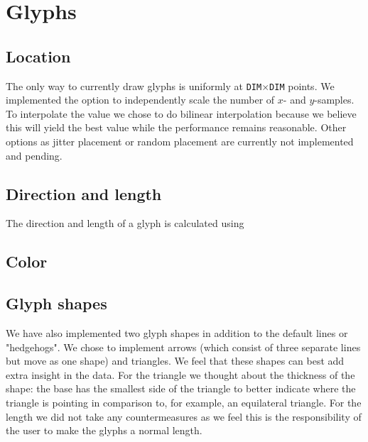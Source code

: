 \section{Glyphs}
	\label{sec:glyphs}
	\subsection*{Location}
		The only way to currently draw glyphs is uniformly at \texttt{DIM}$\times$\texttt{DIM} points.
		We implemented the option to independently scale the number of $x$- and $y$-samples.
		To interpolate the value we chose to do bilinear interpolation because we believe this will yield the best value while the performance remains reasonable.
		Other options as jitter placement or random placement are currently not implemented and pending. 

	\subsection*{Direction and length}
		The direction and length of a glyph is calculated using 
	
	\subsection*{Color}

	\subsection*{Glyph shapes}
		We have also implemented two glyph shapes in addition to the default lines or "hedgehogs".
		We chose to implement arrows (which consist of three separate lines but move as one shape) and triangles.
		We feel that these shapes can best add extra insight in the data.
		For the triangle we thought about the thickness of the shape: the base has the smallest side of the triangle to better indicate where the triangle is pointing in comparison to, for example, an equilateral triangle.
		For the length we did not take any countermeasures as we feel this is the responsibility of the user to make the glyphs a normal length. 

